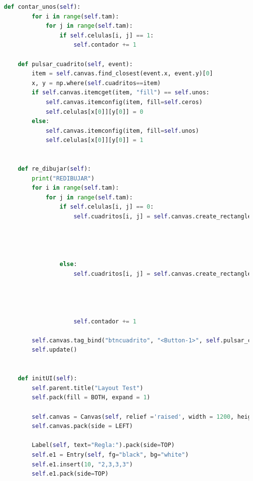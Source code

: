 \begin{lstlisting}[language=Python]
    def contar_unos(self):
        for i in range(self.tam):
            for j in range(self.tam):
                if self.celulas[i, j] == 1:
                    self.contador += 1

    def pulsar_cuadrito(self, event):
        item = self.canvas.find_closest(event.x, event.y)[0]
        x, y = np.where(self.cuadritos==item)
        if self.canvas.itemcget(item, "fill") == self.unos:
            self.canvas.itemconfig(item, fill=self.ceros)
            self.celulas[x[0]][y[0]] = 0
        else:
            self.canvas.itemconfig(item, fill=self.unos)
            self.celulas[x[0]][y[0]] = 1


    def re_dibujar(self):
        print("REDIBUJAR")
        for i in range(self.tam):
            for j in range(self.tam):
                if self.celulas[i, j] == 0:
                    self.cuadritos[i, j] = self.canvas.create_rectangle(0 + (j * self.tam_cuadro),
                                                                        0 + (i * self.tam_cuadro),
                                                                        self.tam_cuadro + (j * self.tam_cuadro),
                                                                        self.tam_cuadro + (i * self.tam_cuadro),
                                                                        fill=self.ceros, width=0, tag="btncuadrito")
                else:
                    self.cuadritos[i, j] = self.canvas.create_rectangle(0 + (j * self.tam_cuadro),
                                                                        0 + (i * self.tam_cuadro),
                                                                        self.tam_cuadro + (j * self.tam_cuadro),
                                                                        self.tam_cuadro + (i * self.tam_cuadro),
                                                                        fill=self.unos, width=0, tag="btncuadrito")
                    self.contador += 1

        self.canvas.tag_bind("btncuadrito", "<Button-1>", self.pulsar_cuadrito)
        self.update()


    def initUI(self):
        self.parent.title("Layout Test")
        self.pack(fill = BOTH, expand = 1)

        self.canvas = Canvas(self, relief ='raised', width = 1200, height = 800)
        self.canvas.pack(side = LEFT)

        Label(self, text="Regla:").pack(side=TOP)
        self.e1 = Entry(self, fg="black", bg="white")
        self.e1.insert(10, "2,3,3,3")
        self.e1.pack(side=TOP)


\end{lstlisting}
